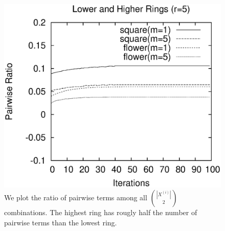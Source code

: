 \documentclass[smallextended]{svjour3}       %
\begin{document}
{{\begin{figure}[h!]
\center
\includegraphics[scale=0.5]{images/optimization/pairwise-ratio/plot-pairwiseratio-lowerHigher-concavities-probe.eps}
\caption{We plot the ratio of pairwise terms among all $\binom{|X^{(i)}|}{2}$ combinations. The highest ring has rougly half the number of pairwise terms  than the lowest ring.}
\label{fig:ratio-pairwise-terms}
\end{figure}


}}
\end{document}
